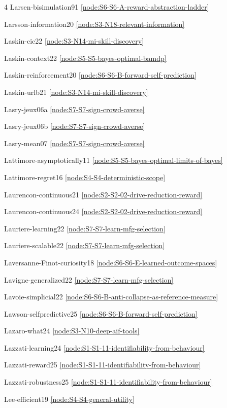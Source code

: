 \documentclass[10pt]{article}
\begin{document}
{\begin{multicols}{4}
Larsen-bisimulation91 \hfill \ref{node:S6-S6-A-reward-abstraction-ladder}\par
Larsson-information20 \hfill \ref{node:S3-N18-relevant-information}\par
Laskin-cic22 \hfill \ref{node:S3-N14-mi-skill-discovery}\par
Laskin-context22 \hfill \ref{node:S5-S5-bayes-optimal-bamdp}\par
Laskin-reinforcement20 \hfill \ref{node:S6-S6-B-forward-self-prediction}\par
Laskin-urlb21 \hfill \ref{node:S3-N14-mi-skill-discovery}\par
Lasry-jeux06a \hfill \ref{node:S7-S7-sign-crowd-averse}\par
Lasry-jeux06b \hfill \ref{node:S7-S7-sign-crowd-averse}\par
Lasry-mean07 \hfill \ref{node:S7-S7-sign-crowd-averse}\par
Lattimore-asymptotically11 \hfill \ref{node:S5-S5-bayes-optimal-limits-of-bayes}\par
Lattimore-regret16 \hfill \ref{node:S4-S4-deterministic-scope}\par
Laurencon-continuous21 \hfill \ref{node:S2-S2-02-drive-reduction-reward}\par
Laurencon-continuous24 \hfill \ref{node:S2-S2-02-drive-reduction-reward}\par
Lauriere-learning22 \hfill \ref{node:S7-S7-learn-mfg-selection}\par
Lauriere-scalable22 \hfill \ref{node:S7-S7-learn-mfg-selection}\par
Laversanne-Finot-curiosity18 \hfill \ref{node:S6-S6-E-learned-outcome-spaces}\par
Lavigne-generalized22 \hfill \ref{node:S7-S7-learn-mfg-selection}\par
Lavoie-simplicial22 \hfill \ref{node:S6-S6-B-anti-collapse-as-reference-measure}\par
Lawson-selfpredictive25 \hfill \ref{node:S6-S6-B-forward-self-prediction}\par
Lazaro-what24 \hfill \ref{node:S3-N10-deep-aif-tools}\par
Lazzati-learning24 \hfill \ref{node:S1-S1-11-identifiability-from-behaviour}\par
Lazzati-reward25 \hfill \ref{node:S1-S1-11-identifiability-from-behaviour}\par
Lazzati-robustness25 \hfill \ref{node:S1-S1-11-identifiability-from-behaviour}\par
Lee-efficient19 \hfill \ref{node:S4-S4-general-utility}\par

\end{multicols}}
\end{document}
